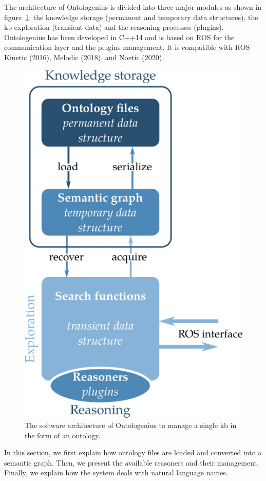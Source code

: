 The architecture of Ontologenius is divided into three major modules as shown in figure~\ref{fig:chap2_archi_single}: the knowledge storage (permanent and temporary data structures), the \acrshort{kb} exploration (transient data) and the reasoning processes (plugins). Ontologenius has been developed in C++14 and is based on ROS for the communication layer and the plugins management. It is compatible with ROS Kinetic (2016), Melodic (2018), and Noetic (2020). 

\begin{figure}[ht!]
\centering
\includegraphics[scale=0.5]{figures/chapter2/archi_single.png}
\caption{\label{fig:chap2_archi_single} The software architecture of Ontologenius to manage a single \acrlong{kb} in the form of an ontology.}
\end{figure}

In this section, we first explain how ontology files are loaded and converted into a semantic graph. Then, we present the available reasoners and their management. Finally, we explain how the system deals with natural language names.


